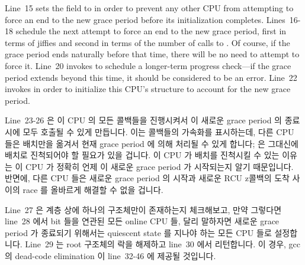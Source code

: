 Line~15 sets the  field to  in order
to prevent any other CPU from attempting to force an end to the new
grace period before its initialization completes.
Lines~16-18 schedule the next attempt to force an end to the new
grace period, first in terms of jiffies and second in terms of the
number of calls to .
Of course, if the grace period ends naturally before that time,
there will be no need to attempt to force it.
Line~20 invokes  to schedule a
longer-term progress check---if the grace period extends beyond this
time, it should be considered to be an error.
Line~22 invokes  in order to initialize this
CPU's  structure to account for the new grace period.
\fi

Line~23-26 은 이 CPU 의 모든 콜백들을 진행시켜서 이 새로운 grace period 의 종료
시에 모두 호출될 수 있게 만듭니다.
이는 콜백들의 가속화를 표시하는데, 다른 CPU 들은 
배치만을 옮겨서 현재 grace period 에 의해 처리될 수 있게 합니다;
 은 그대신에  배치로 진척되어야 할
필요가 있을 겁니다.
이 CPU 가  배치를 진척시킬 수 있는 이유는 이 CPU 가 정확히
언제 이 새로운 grace period 가 시작되는지 알기 때문입니다.
반면에, 다른 CPU 들은 새로운 grace period 의 시작과 새로운 RCU z콜백의 도착
사이의 race 를 올바르게 해결할 수 없을 겁니다.
\iffalse

Lines~23-26 advance all of this CPU's callbacks so that they will
be eligible to be invoked at the end of this new grace period.
This represents an acceleration of callbacks, as other CPUs would only
be able to move the \co{RCU_NEXT_READY_TAIL} batch to be serviced
by the current grace period; the \co{RCU_NEXT_TAIL} would instead
need to be advanced to the \co{RCU_NEXT_READY_TAIL} batch.
The reason that this CPU can accelerate the \co{RCU_NEXT_TAIL} batch
is that it knows exactly when this new grace period started.
In contrast, other CPUs would be unable to correctly resolve the
race between the start of a new grace period and the arrival of
a new RCU callback.
\fi

Line~27 은 계층 상에 하나의  구조체만이 존재하는지 체크해보고,
만약 그렇다면 line~28 에서  bit 들을 연관된 모든 online CPU 들,
달리 말하자면 새로운 grace period 가 종료되기 위해서는 quiescent state 를
지나야 하는 모든 CPU 들로 설정합니다.
Line~29 는 root  구조체의 락을 해제하고 line~30 에서 리턴합니다.
이 경우, gcc 의 dead-code elimination 이 line~32-46 에 제공될 것입니다.

